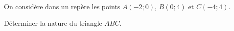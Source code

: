 
On considère dans un repère \Oij les points $A(-2;0)$, $B(0;4)$ et $C(-4;4)$. 

Déterminer la nature du triangle $ABC$. 